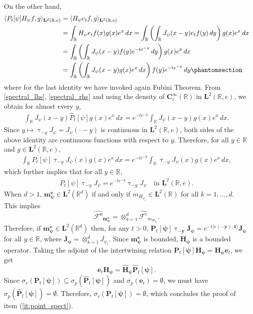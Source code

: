 \documentclass[12pt]{amsart}
\newcommand{\hlabel}{\phantomsection\label}
\numberwithin{equation}{section}
\newcommand{\bb}{\mathbb}
\newcommand{\cc}{\mathcal}
\newcommand{\hpt}[2]{#2}
\newcommand{\tred}{}
\newcommand{\bmrm}[2][2]{\mathbf{#2}^{#1}}
\newcommand{\fouh}{\mathcal{F}^{\mathbf{e}}}
\newcommand{\Mpsi}{\mm^{\mathbf e}_{{\bm{\psi}}}}
\newcommand{\Jp}{J_{\psi}}
\newcommand{\Hpsi}{H_\psi}
\newcommand{\fouho}{\cc{F}^{e}}
\newcommand{\C}{\mathbf{C}}
\newcommand{\mm}{\mathbf{m}}
\renewcommand{\tau}{\uptau}
\theoremstyle{definition}
\theoremstyle{assump}
\theoremstyle{remark}
\begin{document}
{\begin{align}
\end{align}
On the other hand,
\begin{align}
\langle P_t[\psi]\Hpsi f , g\rangle_{\bmrm{L}(\bb{R},e)}&=\langle \Hpsi e_t  f ,g\rangle_{\bmrm{L}(\bb{R},e)} \nonumber \\
&=\int_{\bb{R}}\Hpsi e_t  f (x)g(x)e^x\,dx=\int_{\bb{R}}\left(\int_{\bb{R}}\Jp(x-y) e_t  f (y)\,dy\right)  g(x)e^x\,dx\nonumber\\
&=\int_{\bb{R}}\left(\int_{\bb{R}}\Jp(x-y) f (y)e^{-te^{-y}}\,dy\right)g(x)e^x\,dx\nonumber \\
&=\int_{\bb{R}}\left(\int_{\bb{R}}\Jp(x-y)g(x)e^x\,dx\right) f(y)e^{-te^{-y}}\,dy \hlabel{spectral_rhs}
\end{align}
where for the last identity we have invoked again Fubini Theorem.
From \eqref{spectral_lhs}, \eqref{spectral_rhs} and using the density of $\C^\infty_c(\bb{R})$ in $\bmrm{L}(\bb{R},e)$, we obtain for almost every $y$,
\begin{align*}
\int_{\bb{R}}\Jp(x-y)\widehat{P}_t[\psi]g(x)e^x\,dx=e^{-te^{-y}}\int_{\bb{R}}\Jp(x-y)g(x)e^x\,dx.
\end{align*}
\hpt{R30}{Since $y\mapsto\uptau_{-y}\Jp= \Jp(\cdot - y)$ is continuous in $\bmrm{L}(\bb R,e)$, both sides of the above identity are continuous functions with respect to $y$. Therefore, for all $y\in\bb{R}$ and $g\in\bmrm{L}(\bb{R},e)$,}
\begin{align*}
\int_{\bb{R}}P_t[\psi]\tau_{-y}\Jp(x) g(x) e^x\,dx=e^{-te^{-y}}\int_{\bb{R}}\tau_{-y}\Jp(x)g(x)e^x\,dx, \nonumber
\end{align*}
which further implies that for all $y\in\bb{R}$,
\begin{align*}
P_t[\psi]\tau_{-y}\Jp=e^{-te^{-y}}\tau_{-y}\Jp \quad \text{in  $\bmrm{L}(\bb R,e)$}. \nonumber
\end{align*}
When $d>1$, $\Mpsi\in\bmrm{L}(\bb{R}^d)$ if and only if $m_{H_{\psi_i}}\in\bmrm{L}(\bb{R})$ for all $k=1,\ldots,d$. This implies
\begin{equation*}
\widehat{\fouh}_{\!\!\!\!\!\Mpsi}=\otimes_{k=1}^d \widehat{\fouho}_{\!\!m_{H_{\psi_i}}}.
\end{equation*}
Therefore, if $\Mpsi\in\bmrm{L}(\bb{R}^d)$ then, for any $t>0$, $\bm{P}_t[\bm{\psi}]\tau_{-\tred{\bm y}}\mathbf{J}_{\bm{\psi}}=
e^{-t\langle e(-\bm{y}),\bm{1}\rangle}\mathbf{J}_{\bm{\psi}}$ for all $y\in\bb{R}$, where $\mathbf{J}_{\bm{\psi}}=\otimes_{k=1}^d J_{\psi_i}$. Since $\Mpsi$ is bounded, $\bm{\Hpsi}$ is a bounded operator. Taking the adjoint of the intertwining relation $\bm{P}_t[\bm{\psi}]\bm{\Hpsi}=\bm{\Hpsi}\bm{e}_t$, we get
\begin{equation*}
\bm{e}_t\widehat{\bm{H}}_{\bm\psi}=\widehat{\bm{H}}_{\bm\psi}\widehat{\bm{P}}_t[\bm{\psi}].
\end{equation*}
Since $\sigma_r(\bm{P}_t[\bm{\psi}])\subseteq\sigma_p(\widehat{\bm{P}}_t[\bm{\psi}])$ and  $\sigma_p(\bm{e}_t)=\emptyset$, we must have $\sigma_p(\widehat{\bm{P}}_t[\bm \psi])=\emptyset$. Therefore, $\sigma_r(\bm{P}_t[\bm{\psi}])=\emptyset$, which concludes the proof of item (\ref{it:point_spect}).

}
\end{document}
